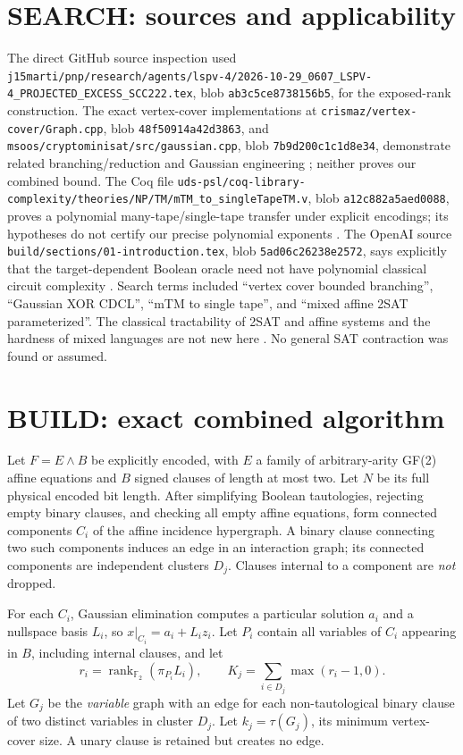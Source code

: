 \documentclass[11pt]{article}
\newcommand{\GF}{\mathbb F_2}
\begin{document}
\section{SEARCH: sources and applicability}
The direct GitHub source inspection used \texttt{j15marti/pnp/research/agents/lspv-4/2026-10-29\_0607\_LSPV-4\_PROJECTED\_EXCESS\_SCC222.tex}, blob \texttt{ab3c5ce8738156b5}, for the exposed-rank construction. The exact vertex-cover implementations at \texttt{crismaz/vertex-cover/Graph.cpp}, blob \texttt{48f50914a42d3863}, and \texttt{msoos/cryptominisat/src/gaussian.cpp}, blob \texttt{7b9d200c1c1d8e34}, demonstrate related branching/reduction and Gaussian engineering \cite{vc,cms}; neither proves our combined bound. The Coq file \texttt{uds-psl/coq-library-complexity/theories/NP/TM/mTM\_to\_singleTapeTM.v}, blob \texttt{a12c882a5aed0088}, proves a polynomial many-tape/single-tape transfer under explicit encodings; its hypotheses do not certify our precise polynomial exponents \cite{coq}. The OpenAI source \texttt{build/sections/01-introduction.tex}, blob \texttt{5ad06c26238e2572}, says explicitly that the target-dependent Boolean oracle need not have polynomial classical circuit complexity \cite{openai}. Search terms included ``vertex cover bounded branching'', ``Gaussian XOR CDCL'', ``mTM to single tape'', and ``mixed affine 2SAT parameterized''. The classical tractability of 2SAT and affine systems and the hardness of mixed languages are not new here \cite{schaefer,apt}. No general SAT contraction was found or assumed.

\section{BUILD: exact combined algorithm}
Let $F=E\land B$ be explicitly encoded, with $E$ a family of arbitrary-arity GF(2) affine equations and $B$ signed clauses of length at most two. Let $N$ be its full physical encoded bit length. After simplifying Boolean tautologies, rejecting empty binary clauses, and checking all empty affine equations, form connected components $C_i$ of the affine incidence hypergraph. A binary clause connecting two such components induces an edge in an interaction graph; its connected components are independent clusters $D_j$. Clauses internal to a component are \emph{not} dropped.

For each $C_i$, Gaussian elimination computes a particular solution $a_i$ and a nullspace basis $L_i$, so $x|_{C_i}=a_i+L_i z_i$. Let $P_i$ contain all variables of $C_i$ appearing in $B$, including internal clauses, and let
\[
 r_i=\operatorname{rank}_{\GF}(\pi_{P_i}L_i),\qquad
 K_j=\sum_{i\in D_j}\max(r_i-1,0).
\]
Let $G_j$ be the \emph{variable} graph with an edge for each non-tautological binary clause of two distinct variables in cluster $D_j$. Let $k_j=\tau(G_j)$, its minimum vertex-cover size. A unary clause is retained but creates no edge.
\end{document}
